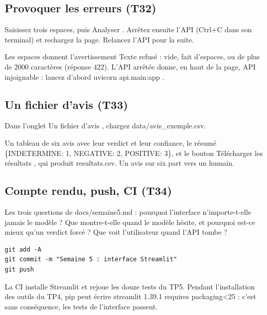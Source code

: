 \documentclass[11pt,a4paper]{article}
\newcommand{\co}[1]{{\ttfamily\hyphenchar\font=45\relax #1}}
\begin{document}
\subsection{Provoquer les erreurs (T32)}

Saisissez trois espaces, puis \og Analyser \fg{}. Arrêtez ensuite l'API (\co{Ctrl+C} dans son terminal) et
rechargez la page. Relancez l'API pour la suite.

\begin{attendu}
Les espaces donnent l'avertissement \og Texte refusé : vide, fait d'espaces, ou de plus de 2000 caractères \fg{}
(réponse 422). L'API arrêtée donne, en haut de la page, \og API injoignable : lancez d'abord uvicorn
api.main:app \fg{}.
\end{attendu}

\subsection{Un fichier d'avis (T33)}

Dans l'onglet \og Un fichier d'avis \fg{}, chargez \co{data/avis\_exemple.csv}.

\begin{attendu}[T33 : le lot]
Un tableau de six avis avec leur verdict et leur confiance, le résumé
\co{\{\textquotesingle{}INDETERMINE\textquotesingle{}: 1, \textquotesingle{}NEGATIVE\textquotesingle{}: 2, \textquotesingle{}POSITIVE\textquotesingle{}: 3\}},
et le bouton \og Télécharger les résultats \fg{}, qui produit \co{resultats.csv}. Un avis sur six part vers un
humain.
\end{attendu}

\subsection{Compte rendu, push, CI (T34)}

Les trois questions de \co{docs/semaine5.md} : pourquoi l'interface n'importe-t-elle jamais le modèle ? Que
montre-t-elle quand le modèle hésite, et pourquoi est-ce mieux qu'un verdict forcé ? Que voit l'utilisateur
quand l'API tombe ?

\begin{lstlisting}
git add -A
git commit -m "Semaine 5 : interface Streamlit"
git push
\end{lstlisting}

\begin{attendu}
La CI installe Streamlit et rejoue les douze tests du TP5. Pendant l'installation des outils du TP4, pip peut
écrire \co{streamlit 1.39.1 requires packaging<25} : c'est sans conséquence, les tests de l'interface passent.
\end{attendu}
\end{document}
